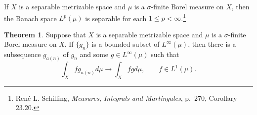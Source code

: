 \documentclass{article}
\theoremstyle{definition}
\newtheorem{theorem}{Theorem}
\theoremstyle{definition}
\begin{document}
If $X$ is a separable metrizable space and $\mu$ is a $\sigma$-finite Borel measure on $X$, then
the Banach space $L^p(\mu)$ is separable for each $1 \leq p < \infty$.\footnote{Ren\'e L. Schilling,
{\em Measures, Integrals and Martingales}, p.~270, Corollary 23.20.} 

\begin{theorem}
Suppose that $X$ is a separable metrizable space and $\mu$ is a $\sigma$-finite Borel measure on $X$.
 If $\{g_n\}$ is a bounded subset of $L^\infty(\mu)$, then there is a subsequence $g_{a(n)}$ of $g_n$ and some
$g \in L^\infty(\mu)$ such that
\[
\int_X f g_{a(n)} d\mu \to \int_X f g d\mu, \qquad f \in L^1(\mu).
\] 
\label{subsequence}
\end{theorem}
\end{document}
